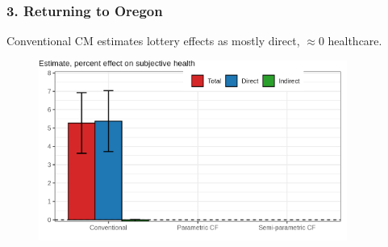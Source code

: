 \documentclass[dvipsnames]{beamer} %
\begin{document}
\begin{frame}
    \frametitle{3. Returning to Oregon}
    Conventional CM estimates lottery effects as mostly direct, $\approx 0$ healthcare.
    \vskip0.5cm
    
    \begin{figure}
        \centering
        \includegraphics[width=0.9\textwidth]{
            ../text/sections/figures/mediation-health-placeholder.png}
    \end{figure}

\end{frame}
\end{document}
